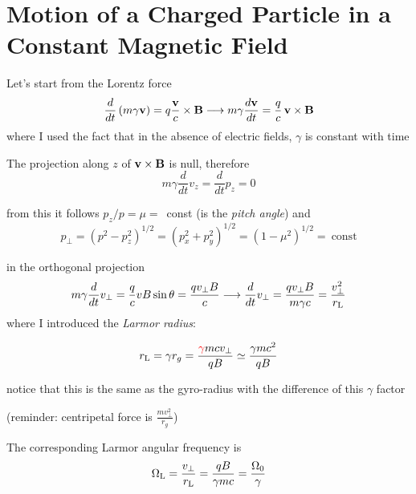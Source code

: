 \section{Motion of a Charged Particle in a Constant Magnetic Field}

Let's start from the Lorentz force
%
\begin{equation*}
\frac{d}{dt} \left( m \gamma \vb v\right) = q \frac{\vb v}{c} \times \vb B \longrightarrow m \gamma \frac{d\vb v}{dt} = \frac{q}{c} \, \vb v \times \vb B
\end{equation*}
%
where I used the fact that in the absence of electric fields, $\gamma$ is constant with time %

The projection along $z$ of $\vb v \times \vb B$ is null, therefore
%
\begin{equation*}
m \gamma \frac{d}{dt} v_z = \frac{d}{dt} p_z = 0
\end{equation*}


from this it follows $p_z / p = \mu =$~const (is the \emph{pitch angle}) and 
%
\begin{equation*}
p_\perp = (p^2 - p_z^2)^{1/2} = (p_x^2 + p_y^2)^{1/2} = (1-\mu^2)^{1/2} =~\text{const}
\end{equation*}

in the orthogonal projection
%
\begin{equation*}
m \gamma \frac{d}{dt} v_\perp = \frac{q}{c} v B \sin \theta = \frac{q v_\perp B}{c}  
\longrightarrow \frac{d}{dt} v_\perp = \frac{q v_\perp B}{m \gamma c}  = \frac{v_\perp^2}{r_{\rm L}}
\end{equation*}
%
where I introduced the \emph{Larmor radius}:
%
\begin{remark}
\[
r_{\rm L} = \gamma r_g = \frac{{\color{red}\gamma} m c  v_\perp}{q B} \simeq \frac{\gamma m c^2}{qB}
\]
\end{remark}
%
notice that this is the same as the gyro-radius with the difference of this $\gamma$ factor

(reminder: centripetal force is $\frac{m v_\perp^2}{r_g}$)

The corresponding Larmor angular frequency is
%
\begin{equation*}
\Omega_{\rm L} = \frac{v_\perp}{r_{\rm L}} = \frac{qB}{\gamma m c} = \frac{\Omega_0}{\gamma}
\end{equation*}

